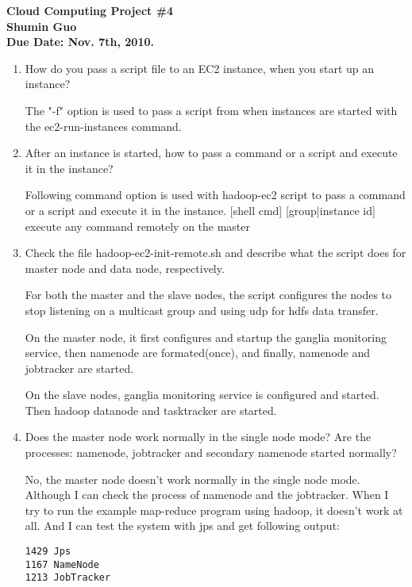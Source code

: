 \documentclass{article}
\begin{document}
\begin{center}
\textbf{{\LARGE Cloud Computing Project \#4} \\
Shumin Guo \\
Due Date: Nov. 7th, 2010.}
\end{center}

\begin{enumerate}

\item How do you pass a script file to an EC2 instance, when you start
up an instance?

The "-f" option is used to pass a script from when instances are started
with the ec2-run-instances command. 

\item After an instance is started, how to pass a command or a script
and execute it in the instance?

Following command option is used with hadoop-ec2 script to pass a
command or a script and execute it in the instance. 
[shell cmd] [group|instance id] execute any command remotely on
the master

\item Check the file hadoop-ec2-init-remote.sh and describe what the
script does for master node and data node, respectively.

For both the master and the slave nodes, the script configures the
nodes to stop listening on a multicast group and using udp for hdfs data
transfer. 

On the master node, it first configures and startup the ganglia
monitoring service, then namenode are formated(once), and finally,
namenode and jobtracker are started. 

On the slave nodes, ganglia monitoring service is configured and
started. Then hadoop datanode and tasktracker are started. 

\item Does the master node work normally in the single node mode? Are
the processes: namenode, jobtracker and secondary namenode started
normally? 

No, the master node doesn't work normally in the single node
mode. Although I can check the process of namenode and the
jobtracker. When I try to run the example map-reduce program using
hadoop, it doesn't work at all. 
And I can test the system with jps and get following output:
\begin{verbatim}
1429 Jps
1167 NameNode
1213 JobTracker
\end{verbatim}


\end{enumerate}
\end{document}
